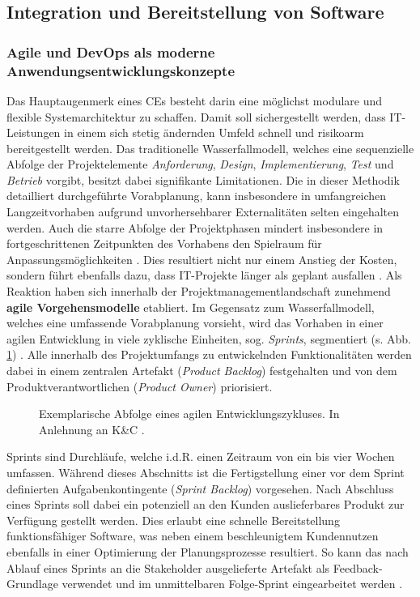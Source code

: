 \newpage
\subsection{Integration und Bereitstellung von Software}
\subsubsection{Agile und DevOps als moderne Anwendungsentwicklungskonzepte}
Das Hauptaugenmerk eines CEs besteht darin eine möglichst modulare und flexible Systemarchitektur zu schaffen. Damit soll sichergestellt werden, dass IT-Leistungen in einem sich stetig ändernden Umfeld schnell und risikoarm bereitgestellt werden. Das traditionelle Wasserfallmodell, welches eine sequenzielle Abfolge der Projektelemente \textit{Anforderung}, \textit{Design}, \textit{Implementierung}, \textit{Test} und \textit{Betrieb} vorgibt, besitzt dabei signifikante Limitationen. Die in dieser Methodik detailliert durchgeführte Vorabplanung, kann insbesondere in umfangreichen Langzeitvorhaben aufgrund unvorhersehbarer Externalitäten selten eingehalten werden. Auch die starre Abfolge der Projektphasen mindert insbesondere in fortgeschrittenen Zeitpunkten des Vorhabens den Spielraum für Anpassungsmöglichkeiten \cite[5]{Vivenzio.2013}. Dies resultiert nicht nur einem Anstieg der Kosten, sondern führt ebenfalls dazu, dass IT-Projekte länger als geplant ausfallen \cite[41]{Vieweg.2015}. Als Reaktion haben sich innerhalb der Projektmanagementlandschaft zunehmend \textbf{agile Vorgehensmodelle} etabliert.
Im Gegensatz zum Wasserfallmodell, welches eine umfassende Vorabplanung vorsieht, wird das Vorhaben in einer agilen Entwicklung in viele zyklische Einheiten, sog. \textit{Sprints}, segmentiert (s. Abb. \ref*{fig:Agile_Cycle}) \cite[87]{Goll.2015}. Alle innerhalb des Projektumfangs zu entwickelnden Funktionalitäten werden dabei in einem zentralen Artefakt (\textit{Product Backlog}) festgehalten und von dem Produktverantwortlichen (\textit{Product Owner}) priorisiert. 
\begin{center}
	\begin{figure}[H]
		\centering
		\caption[Exemplarische Abfolge eines agilen Entwicklungszykluses]{Exemplarische Abfolge eines agilen Entwicklungszykluses. In Anlehnung an K\&C \cite{K&C.2021}.}
		\label{fig:Agile_Cycle}
	\end{figure}	
\end{center}
\vspace*{-15mm}
Sprints sind Durchläufe, welche i.d.R. einen Zeitraum von ein bis vier Wochen umfassen. Während dieses Abschnitts ist die Fertigstellung einer vor dem Sprint definierten Aufgabenkontingente (\textit{Sprint Backlog}) vorgesehen. Nach Abschluss eines Sprints soll dabei ein potenziell an den Kunden auslieferbares Produkt zur Verfügung gestellt werden. Dies erlaubt eine schnelle Bereitstellung funktionsfähiger Software, was neben einem beschleunigtem Kundennutzen ebenfalls in einer Optimierung der Planungsprozesse resultiert. So kann das nach Ablauf eines Sprints an die Stakeholder ausgelieferte Artefakt als Feedback-Grundlage verwendet und im unmittelbaren Folge-Sprint eingearbeitet werden \cite[39]{K&C.2021}.
